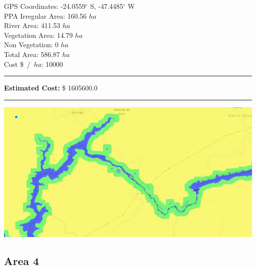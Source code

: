 \documentclass{article}
\begin{document}
    \begin{minipage}{0.5\linewidth}

    GPS Coordinates: -24.0559$^{\circ}$ S, -47.4485$^{\circ}$ W    \\
    PPA Irregular Area: 160.56 $ha$  \\
    River Area: 411.53 $ha$              \\
    Vegetation Area: 14.79 $ha$           \\
    Non Vegetation: 0 $ha$           \\
    Total Area: 586.87 $ha$              \\
    Cost \$~/~$ha$: 10000               \\
    \rule{\linewidth}{1pt}
    \textbf{Estimated Cost:} \$ 1605600.0           \\
    \rule{\linewidth}{1pt}

    \end{minipage}\hfil
    \begin{minipage}{0.5\linewidth}
        \includegraphics[width=\linewidth]{map.jpg}
    \end{minipage}
    
    \subsection{Area 4}
\end{document}
